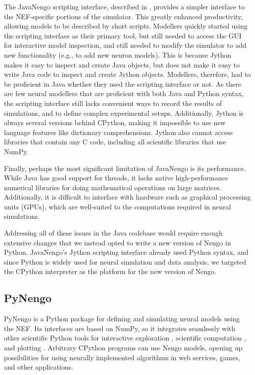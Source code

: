 \documentclass{frontiersSCNS}
\begin{document}
The JavaNengo scripting interface,
described in \citet{stewart2009},
provides a simpler interface
to the NEF-specific portions of the simulator.
This greatly enhanced productivity,
allowing models to be described
by short scripts.
Modellers quickly started using
the scripting interface
as their primary tool,
but still needed to access the GUI
for interactive model inspection,
and still needed to modify the simulator
to add new functionality
(e.g., to add new neuron models).
This is because Jython makes it easy
to inspect and create Java objects,
but does not make it easy to
write Java code to
inspect and create Jython objects.
Modellers, therefore, had to be
proficient in Java whether
they used the scripting interface or not.
As there are few neural modellers
that are proficient with both Java and Python syntax,
the scripting interface still lacks
convenient ways to record the results of simulations,
and to define complex experimental setups.
Additionally, Jython is always several versions
behind CPython, making it impossible
to use new language features
like dictionary comprehensions.
Jython also cannot access libraries
that contain any C code,
including all scientific libraries
that use NumPy.

Finally, perhaps the most significant limitation
of JavaNengo is its performance.
While Java has good support for threads,
it lacks native high-performance numerical libraries
for doing mathematical operations on large matrices.
Additionally, it is difficult to interface with
hardware such as graphical processing units (GPUs),
which are well-suited to the computations
required in neural simulations.

Addressing all of these issues
in the Java codebase would require
enough extensive changes
that we instead opted
to write a new version of Nengo in Python.
JavaNengo's Jython scripting interface
already used Python syntax,
and since Python is widely used
for neural simulation and data analysis,
we targeted the CPython interpreter
as the platform for the new version of Nengo.

\subsection{PyNengo}

PyNengo is a Python package for
defining and simulating
neural models using the NEF.
Its interfaces are based on NumPy,
so it integrates seamlessly
with other scientific Python tools
for interactive exploration \citep{perez2007},
scientific computation \citep{oliphant2007},
and plotting \citep{hunter2007}.
Arbitrary CPython programs
can use Nengo models,
opening up possibilities
for using neurally implemented algorithms
in web services, games, and other applications.
\end{document}
